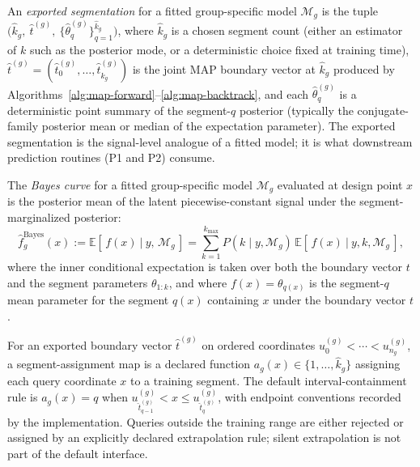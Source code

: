 \begin{definition}
\label{def:exported-segmentation}
An \emph{exported segmentation} for a fitted group-specific model $\mathcal{M}_g$ is the tuple
$\big(\widehat k_g,\ \widehat t^{(g)},\ \{\widehat\theta^{(g)}_q\}_{q=1}^{\widehat k_g}\big)$,
where $\widehat k_g$ is a chosen segment count (either an estimator of $k$ such as the posterior
mode, or a deterministic choice fixed at training time), $\widehat t^{(g)}=(\widehat t^{(g)}_0,\dots,\widehat t^{(g)}_{\widehat k_g})$ is the
joint MAP boundary vector at $\widehat k_g$ produced by Algorithms~\ref{alg:map-forward}--\ref{alg:map-backtrack}, and each $\widehat\theta^{(g)}_q$ is a deterministic point summary of the
segment-$q$ posterior (typically the conjugate-family posterior mean or median of the
expectation parameter). The exported segmentation is the signal-level analogue of a fitted model;
it is what downstream prediction routines (P1 and P2) consume.
\end{definition}

\begin{definition}
\label{def:bayes-curve}
The \emph{Bayes curve} for a fitted group-specific model $\mathcal{M}_g$ evaluated at design
point $x$ is the posterior mean of the latent piecewise-constant signal under the
segment-marginalized posterior:
\[
\widehat f^{\mathrm{Bayes}}_g(x) := \mathbb{E}\!\left[\, f(x)\ \big|\ y,\, \mathcal{M}_g\,\right]
= \sum_{k=1}^{k_{\max}} P(k\mid y,\mathcal{M}_g)\,
\mathbb{E}\!\left[\, f(x)\ \big|\ y, k, \mathcal{M}_g\,\right],
\]
where the inner conditional expectation is taken over both the boundary vector $t$ and the
segment parameters $\theta_{1:k}$, and where $f(x)=\theta_{q(x)}$ is the segment-$q$ mean
parameter for the segment $q(x)$ containing $x$ under the boundary vector $t$.
\end{definition}

\begin{definition}
\label{def:segment-assignment-map}
For an exported boundary vector $\widehat t^{(g)}$ on ordered coordinates
$u_0^{(g)}<\cdots<u_{n_g}^{(g)}$, a segment-assignment map is a declared function
$a_g(x)\in\{1,\dots,\widehat k_g\}$ assigning each query coordinate $x$ to a training segment.
The default interval-containment rule is
$a_g(x)=q$ when $u_{\widehat t^{(g)}_{q-1}}^{(g)} < x \le u_{\widehat t^{(g)}_q}^{(g)}$, with
endpoint conventions recorded by the implementation. Queries outside the training range are either
rejected or assigned by an explicitly declared extrapolation rule; silent extrapolation is not part
of the default interface.
\end{definition}

